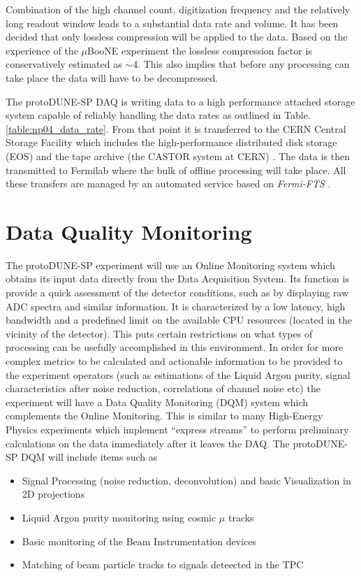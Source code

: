 \documentclass{PoS}
\newcommand{\pd}{protoDUNE\xspace}
\begin{document}
Combination of the high channel count,
digitization frequency
and the relatively long readout window leads to a substantial data rate and volume. It has been decided that only
lossless compression will be applied to the data. Based on the experience of the $\mu$BooNE experiment \cite{uboone}
the lossless compression factor is conservatively estimated as $\sim$4. This also implies that before any processing can
take place the data will have to be decompressed.

The \pd-SP DAQ is writing data to a high performance attached storage system capable of reliably handling the data
rates as outlined in Table.\,\ref{table:np04_data_rate}. From that point it is transferred to the CERN Central Storage
Facility which includes the high-performance distributed disk storage (EOS) and the tape archive (the CASTOR
system at CERN) \cite{castoreos}. The data is then transmitted to Fermilab where the bulk of offline processing
will take place.
All these transfers are managed by an automated service based on \textit{Fermi-FTS} \cite{sam,fts}.



\section{Data Quality Monitoring}
The protoDUNE-SP experiment will use an Online Monitoring system which obtains its input data directly
from the Data Acquisition System. Its function is provide a quick assessment of the detector conditions, such
as by displaying raw ADC spectra and similar information. It is characterized by a  low latency, high bandwidth
and a predefined limit on the available CPU resources (located in the vicinity of the detector). This
puts certain restrictions on what types of processing can be usefully accomplished in this environment.
In order for more complex metrics to be calculated and actionable information to be provided to the experiment operators
(such as estimations of the Liquid Argon purity, signal characteristics after noise reduction, correlations of channel noise etc) 
the experiment will have a Data Quality Monitoring (DQM) system which complements the Online Monitoring.
This is similar to many High-Energy Physics experiments which implement ``express streams'' to perform
preliminary calculations on the data immediately after it leaves the DAQ.
The \pd-SP DQM will include items such as
\begin{itemize}
\item Signal Processing (noise reduction, deconvolution) and basic Visualization in 2D projections
\item Liquid Argon purity monitoring using cosmic $\mu$ tracks
\item Basic monitoring of the Beam Instrumentation devices
\item Matching of beam particle tracks to signals deteected in the TPC
\end{itemize}
\end{document}
